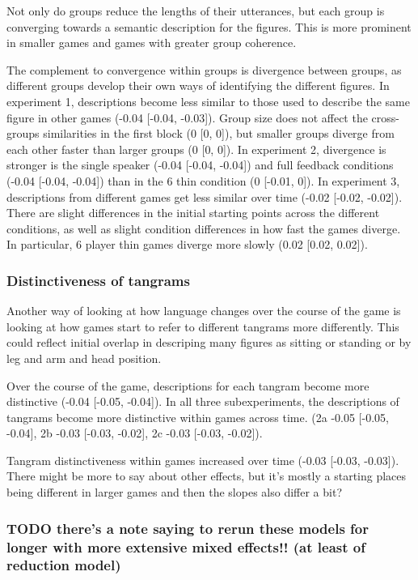 \documentclass[
  english,
  a4paper,
]{article}
\begin{document}
Not only do groups reduce the lengths of their utterances, but each group is converging towards a semantic description for the figures. This is more prominent in smaller games and games with greater group coherence.

The complement to convergence within groups is divergence between groups, as different groups develop their own ways of identifying the different figures. In experiment 1, descriptions become less similar to those used to describe the same figure in other games (-0.04 {[}-0.04, -0.03{]}). Group size does not affect the cross-groups similarities in the first block (0 {[}0, 0{]}), but smaller groups diverge from each other faster than larger groups (0 {[}0, 0{]}). In experiment 2, divergence is stronger is the single speaker (-0.04 {[}-0.04, -0.04{]}) and full feedback conditions (-0.04 {[}-0.04, -0.04{]}) than in the 6 thin condition (0 {[}-0.01, 0{]}). In experiment 3, descriptions from different games get less similar over time (-0.02 {[}-0.02, -0.02{]}). There are slight differences in the initial starting points across the different conditions, as well as slight condition differences in how fast the games diverge. In particular, 6 player thin games diverge more slowly (0.02 {[}0.02, 0.02{]}).

\hypertarget{distinctiveness-of-tangrams}{%
\subsubsection{Distinctiveness of tangrams}\label{distinctiveness-of-tangrams}}

Another way of looking at how language changes over the course of the game is looking at how games start to refer to different tangrams more differently. This could reflect initial overlap in descriping many figures as sitting or standing or by leg and arm and head position.

Over the course of the game, descriptions for each tangram become more distinctive (-0.04 {[}-0.05, -0.04{]}).
In all three subexperiments, the descriptions of tangrams become more distinctive within games across time. (2a -0.05 {[}-0.05, -0.04{]}, 2b -0.03 {[}-0.03, -0.02{]}, 2c -0.03 {[}-0.03, -0.02{]}).

Tangram distinctiveness within games increased over time (-0.03 {[}-0.03, -0.03{]}). There might be more to say about other effects, but it's mostly a starting places being different in larger games and then the slopes also differ a bit?

\hypertarget{todo-theres-a-note-saying-to-rerun-these-models-for-longer-with-more-extensive-mixed-effects-at-least-of-reduction-model}{%
\subsubsection{TODO there's a note saying to rerun these models for longer with more extensive mixed effects!! (at least of reduction model)}\label{todo-theres-a-note-saying-to-rerun-these-models-for-longer-with-more-extensive-mixed-effects-at-least-of-reduction-model}}
\end{document}
